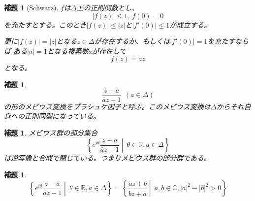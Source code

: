 \documentclass[leqno]{jsarticle}
\newtheorem{lem}[thm]{補題}
\newcommand{\rr}{\mathbb{R}}
\newcommand{\cc}{\mathbb{C}}
\begin{document}
\begin{lem}[Schwarz]\label{S}
$f$は$\Delta$上の正則関数とし、
\[
|f(z)|\le 1,\  f(0)=0
\]
を充たすとする。このとき$|f(z)|\le |z|$と$|f'(0)|\le 1$が成立する。\par
更に$|f(z)|=|z|$となる$z\in \Delta$が存在するか、もしくは$|f'(0)|=1$を充たすならば
ある$|a|=1$となる複素数$a$が存在して
\[
f(z)=az
\]
となる。
\end{lem}
\begin{lem}
\[
\frac{z-a}{\bar{a}z-1}\ \ (a\in \Delta )
\]
の形のメビウス変換をブラシュケ因子と呼ぶ。このメビウス変換は$\Delta$からそれ自身への正則同型になっている。
\end{lem}

\begin{lem}
メビウス群の部分集合
\[
\left\{e^{i\theta}\frac{z-a}{\bar{a}z-1}\middle|\ \theta\in \rr, a\in \Delta \right\}
\]
は逆写像と合成で閉じている。つまりメビウス群の部分群である。
\end{lem}

\begin{lem}
\[
\left\{e^{i\theta}\frac{z-a}{\bar{a}z-1}\middle|\ \theta\in \rr, a\in \Delta \right\}=
\left\{\frac{az+b}{\bar{b}z+\bar{a}}\middle| \ a,b\in \cc, |a|^2-|b|^2>0\right\}
\]
\end{lem}

\end{document}
